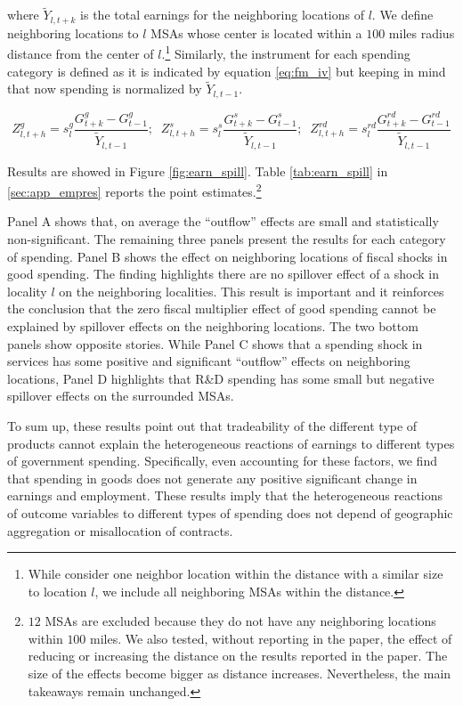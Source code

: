 \documentclass[dv_diss_main.tex]{subfiles}
\begin{document}
where $\tilde{Y}_{l,t+k}$ is the total earnings for the neighboring locations of $l$. We define neighboring locations to $l$ MSAs whose center is located within a $100$ miles radius distance from the center of $l$.\footnote{While \cite{Auerbach2020} consider one neighbor location within the distance with a similar size to location $l$, we include all neighboring MSAs within the distance.} Similarly, the instrument for each spending category is defined as it is indicated by equation \ref{eq:fm_iv} but keeping in mind that now spending is normalized by $\tilde{Y}_{l,t-1}$.

\begin{equation}
    Z_{l,t+h}^g = s_{l}^g \frac{G^g_{t+k}-G^g_{t-1}}{\tilde{Y}_{l,t-1}};\;\;Z_{l,t+h}^s = s_{l}^s \frac{G^s_{t+k}-G^s_{t-1}}{\tilde{Y}_{l,t-1}};\;\;Z_{l,t+h}^{rd} = s_{l}^{rd} \frac{G^{rd}_{t+k}-G^{rd}_{t-1}}{\tilde{Y}_{l,t-1}}
    \label{eq:fm_iv2}
\end{equation}

\noindent Results are showed in Figure \ref{fig:earn_spill}. Table \ref{tab:earn_spill} in \ref{sec:app_empres} reports the point estimates.\footnote{$12$ MSAs are excluded because they do not have any neighboring locations within $100$ miles. We also tested, without reporting in the paper, the effect of reducing or increasing the distance on the results reported in the paper. The size of the effects become bigger as distance increases. Nevertheless, the main takeaways remain unchanged.}

Panel A shows that, on average the ``outflow'' effects are small and statistically non-significant. The remaining three panels present the results for each category of spending. Panel B shows the effect on neighboring locations of fiscal shocks in good spending. The finding highlights there are no spillover effect of a shock in locality $l$ on the neighboring localities. This result is important and it reinforces the conclusion that the zero fiscal multiplier effect of good spending cannot be explained by spillover effects on the neighboring locations. The two bottom panels show opposite stories. While Panel C shows that a spending shock in services has some positive and significant ``outflow'' effects on neighboring locations, Panel D highlights that R\&D spending has some small but negative spillover effects on the surrounded MSAs.
 
To sum up, these results point out that tradeability of the different type of products cannot explain the heterogeneous reactions of earnings to different types of government spending. Specifically, even accounting for these factors, we find that spending in goods does not generate any positive significant change in earnings and employment. These results imply that the heterogeneous reactions of outcome variables to different types of spending does not depend of geographic aggregation or misallocation of contracts.
\end{document}
